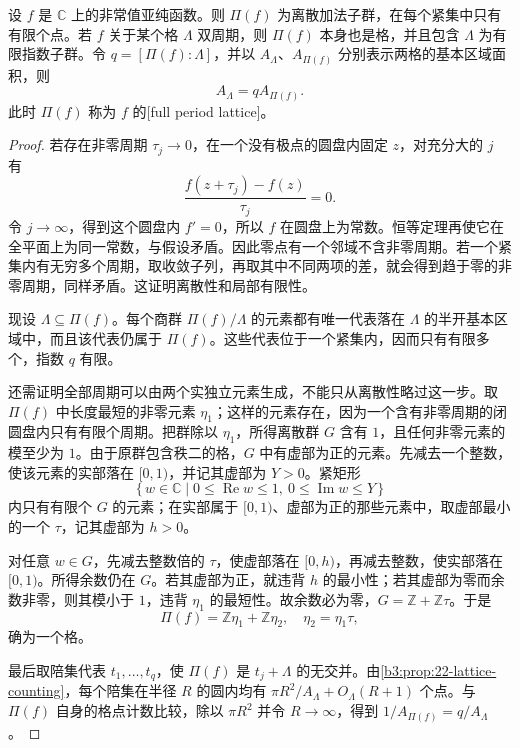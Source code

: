 \begin{proposition}\label{b3:prop:22-period-group}
设 \(f\) 是 \(\mathbb C\) 上的非常值亚纯函数。则 \(\Pi(f)\) 为离散加法子群，在每个紧集中只有有限个点。若 \(f\) 关于某个格 \(\Lambda\) 双周期，则 \(\Pi(f)\) 本身也是格，并且包含 \(\Lambda\) 为有限指数子群。令 \(q=[\Pi(f):\Lambda]\)，并以 \(A_\Lambda\)、\(A_{\Pi(f)}\) 分别表示两格的基本区域面积，则
\[
 A_\Lambda=qA_{\Pi(f)}.
\]
此时 \(\Pi(f)\) 称为 \(f\) 的[full period lattice]。
\end{proposition}
\begin{proof}
若存在非零周期 \(\tau_j\to0\)，在一个没有极点的圆盘内固定 \(z\)，对充分大的 \(j\) 有
\[
 \frac{f(z+\tau_j)-f(z)}{\tau_j}=0.
\]
令 \(j\to\infty\)，得到这个圆盘内 \(f'=0\)，所以 \(f\) 在圆盘上为常数。恒等定理再使它在全平面上为同一常数，与假设矛盾。因此零点有一个邻域不含非零周期。若一个紧集内有无穷多个周期，取收敛子列，再取其中不同两项的差，就会得到趋于零的非零周期，同样矛盾。这证明离散性和局部有限性。

现设 \(\Lambda\subseteq\Pi(f)\)。每个商群 \(\Pi(f)/\Lambda\) 的元素都有唯一代表落在 \(\Lambda\) 的半开基本区域中，而且该代表仍属于 \(\Pi(f)\)。这些代表位于一个紧集内，因而只有有限多个，指数 \(q\) 有限。

还需证明全部周期可以由两个实独立元素生成，不能只从离散性略过这一步。取 \(\Pi(f)\) 中长度最短的非零元素 \(\eta_1\)；这样的元素存在，因为一个含有非零周期的闭圆盘内只有有限个周期。把群除以 \(\eta_1\)，所得离散群 \(G\) 含有 \(1\)，且任何非零元素的模至少为 \(1\)。由于原群包含秩二的格，\(G\) 中有虚部为正的元素。先减去一个整数，使该元素的实部落在 \([0,1)\)，并记其虚部为 \(Y>0\)。紧矩形
\[
 \{\,w\in\mathbb C\mid 0\le\operatorname{Re}w\le1,
 \ 0\le\operatorname{Im}w\le Y\,\}
\]
内只有有限个 \(G\) 的元素；在实部属于 \([0,1)\)、虚部为正的那些元素中，取虚部最小的一个 \(\tau\)，记其虚部为 \(h>0\)。

对任意 \(w\in G\)，先减去整数倍的 \(\tau\)，使虚部落在 \([0,h)\)，再减去整数，使实部落在 \([0,1)\)。所得余数仍在 \(G\)。若其虚部为正，就违背 \(h\) 的最小性；若其虚部为零而余数非零，则其模小于 \(1\)，违背 \(\eta_1\) 的最短性。故余数必为零，\(G=\mathbb Z+\mathbb Z\tau\)。于是
\[
 \Pi(f)=\mathbb Z\eta_1+\mathbb Z\eta_2,
 \quad\eta_2=\eta_1\tau,
\]
确为一个格。

最后取陪集代表 \(t_1,\ldots,t_q\)，使 \(\Pi(f)\) 是 \(t_j+\Lambda\) 的无交并。由\cref{b3:prop:22-lattice-counting}，每个陪集在半径 \(R\) 的圆内均有 \(\pi R^2/A_\Lambda+O_\Lambda(R+1)\) 个点。与 \(\Pi(f)\) 自身的格点计数比较，除以 \(\pi R^2\) 并令 \(R\to\infty\)，得到 \(1/A_{\Pi(f)}=q/A_\Lambda\)。
\end{proof}

